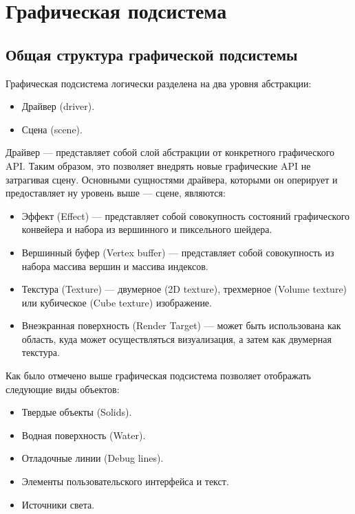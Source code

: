 \section{Графическая подсистема}

\subsection{Общая структура графической подсистемы}

Графическая подсистема логически разделена на два уровня абстракции:
\begin{itemize}
	\item	Драйвер (driver).
	\item	Сцена (scene).
\end{itemize}

Драйвер --- представляет собой слой абстракции от конкретного графического API.
Таким образом, это позволяет внедрять новые графические API не затрагивая сцену.
Основными сущностями драйвера, которыми он оперирует и предоставляет ну уровень выше --- сцене, являются:
\begin{itemize}
	\item	Эффект (Effect) --- представляет собой совокупность 
			состояний графического конвейера и набора из вершинного и пиксельного шейдера.
	\item	Вершинный буфер (Vertex buffer) --- представляет собой совокупность из набора массива вершин и массива индексов.
	\item	Текстура (Texture) --- двумерное (2D texture), трехмерное (Volume texture) или кубическое (Cube texture) изображение.
	\item	Внеэкранная поверхность (Render Target) --- может быть использована 
			как область, куда может осуществляться визуализация, а затем как двумерная текстура.
\end{itemize}


Как было отмечено выше графическая подсистема позволяет отображать следующие виды объектов:

\begin{itemize}
	\item	Твердые объекты (Solids).
	\item	Водная поверхность (Water).
	\item	Отладочные линии (Debug lines).
	\item	Элементы пользовательского интерфейса и текст.
	\item	Источники света.
\end{itemize}


